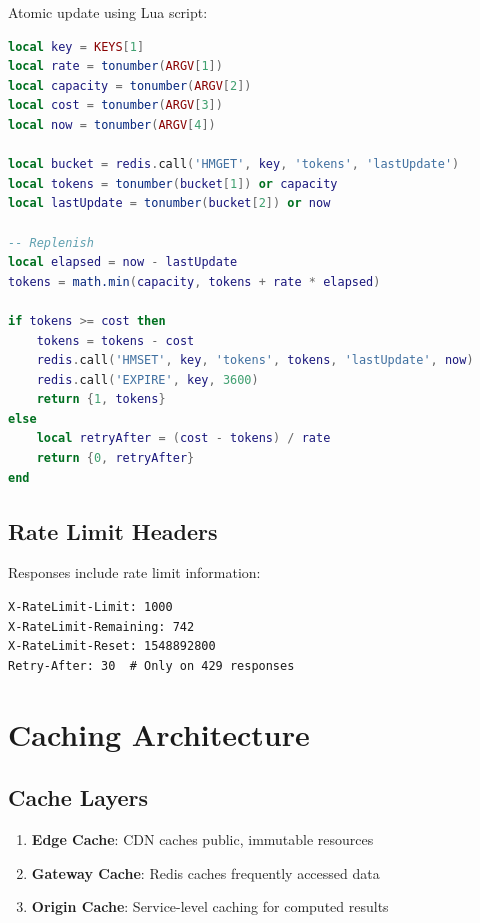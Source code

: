\documentclass[11pt,a4paper]{article}
\begin{document}
Atomic update using Lua script:

\begin{lstlisting}[language=Lua, caption=Atomic Rate Limit Check]
local key = KEYS[1]
local rate = tonumber(ARGV[1])
local capacity = tonumber(ARGV[2])
local cost = tonumber(ARGV[3])
local now = tonumber(ARGV[4])

local bucket = redis.call('HMGET', key, 'tokens', 'lastUpdate')
local tokens = tonumber(bucket[1]) or capacity
local lastUpdate = tonumber(bucket[2]) or now

-- Replenish
local elapsed = now - lastUpdate
tokens = math.min(capacity, tokens + rate * elapsed)

if tokens >= cost then
    tokens = tokens - cost
    redis.call('HMSET', key, 'tokens', tokens, 'lastUpdate', now)
    redis.call('EXPIRE', key, 3600)
    return {1, tokens}
else
    local retryAfter = (cost - tokens) / rate
    return {0, retryAfter}
end
\end{lstlisting}

\subsection{Rate Limit Headers}

Responses include rate limit information:

\begin{lstlisting}[caption=Rate Limit Headers]
X-RateLimit-Limit: 1000
X-RateLimit-Remaining: 742
X-RateLimit-Reset: 1548892800
Retry-After: 30  # Only on 429 responses
\end{lstlisting}

\section{Caching Architecture}

\subsection{Cache Layers}

\begin{enumerate}
    \item \textbf{Edge Cache}: CDN caches public, immutable resources
    \item \textbf{Gateway Cache}: Redis caches frequently accessed data
    \item \textbf{Origin Cache}: Service-level caching for computed results
\end{enumerate}
\end{document}

